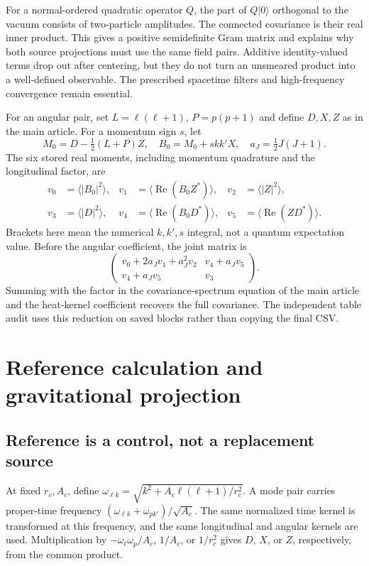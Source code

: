 \documentclass[10pt]{article}
\begin{document}
For a normal-ordered quadratic operator $Q$, the part of $Q|0\rangle$ orthogonal to the vacuum consists of two-particle amplitudes. The connected covariance is their real inner product. This gives a positive semidefinite Gram matrix and explains why both source projections must use the same field pairs. Additive identity-valued terms drop out after centering, but they do not turn an unsmeared product into a well-defined observable. The prescribed spacetime filters and high-frequency convergence remain essential.

For an angular pair, set $L=\ell(\ell+1)$, $P=p(p+1)$ and define $D,X,Z$ as in the main article. For a momentum sign $s$, let
\begin{equation}
 M_0=D-\tfrac12(L+P)Z,\quad B_0=M_0+s kk'X,\quad a_J=\tfrac12J(J+1).
\end{equation}
The six stored real moments, including momentum quadrature and the longitudinal factor, are
\begin{align}
 v_0&=\langle|B_0|^2\rangle,&v_1&=\langle\operatorname{Re}(B_0Z^*)\rangle,
 &v_2&=\langle|Z|^2\rangle,\\
 v_3&=\langle|D|^2\rangle,&v_4&=\langle\operatorname{Re}(B_0D^*)\rangle,
 &v_5&=\langle\operatorname{Re}(ZD^*)\rangle.
\end{align}
Brackets here mean the numerical $k,k',s$ integral, not a quantum expectation value. Before the angular coefficient, the joint matrix is
\begin{equation}
 \begin{pmatrix}
 v_0+2a_Jv_1+a_J^2v_2 & v_4+a_Jv_5\\
 v_4+a_Jv_5 & v_3
 \end{pmatrix}.
\end{equation}
Summing with the factor in the covariance-spectrum equation of the main article and the heat-kernel coefficient recovers the full covariance. The independent table audit uses this reduction on saved blocks rather than copying the final CSV.

\section{Reference calculation and gravitational projection}
\subsection{Reference is a control, not a replacement source}
At fixed $r_c,A_c$, define $\omega_{\ell k}=\sqrt{k^2+A_c\ell(\ell+1)/r_c^2}$. A mode pair carries proper-time frequency $(\omega_{\ell k}+\omega_{pk'})/\sqrt{A_c}$. The same normalized time kernel is transformed at this frequency, and the same longitudinal and angular kernels are used. Multiplication by $-\omega_\ell\omega_p/A_c$, $1/A_c$, or $1/r_c^2$ gives $D$, $X$, or $Z$, respectively, from the common product.
\end{document}
